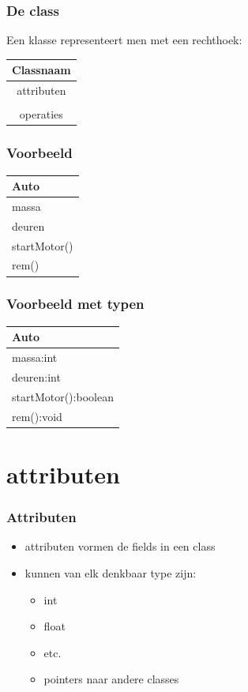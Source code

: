 \documentclass{beamer}
\begin{document}
\begin{frame}\frametitle{De class}
Een klasse representeert men met een rechthoek:\\
\vspace{1cm}
\begin{tabular}{|c|}
\hline
Classnaam\\
\hline
attributen\\
\hline\\
operaties\\
\hline
\end{tabular}
\end{frame}

\begin{frame}\frametitle{Voorbeeld}
  \begin{center}
  \begin{tabular}{|l|}
\hline
Auto\\
\hline
massa\\
deuren\\
\hline
startMotor()\\
rem()\\
\hline
\end{tabular}
  \end{center}
\end{frame}

\begin{frame}\frametitle{Voorbeeld met typen}
  \begin{center}
  \begin{tabular}{|l|}
\hline
Auto\\
\hline
massa:int\\
deuren:int\\
\hline
startMotor():boolean\\
rem():void\\
\hline
\end{tabular}
  \end{center}
\end{frame}

\section{attributen}

\begin{frame}\frametitle{Attributen}
  \begin{itemize}
  \item attributen vormen de fields in een class
  \item kunnen van elk denkbaar type zijn:
    \begin{itemize}
    \item int
    \item float
    \item etc.
    \item pointers naar andere classes
    \end{itemize}
  \end{itemize}
\end{frame}
\end{document}
